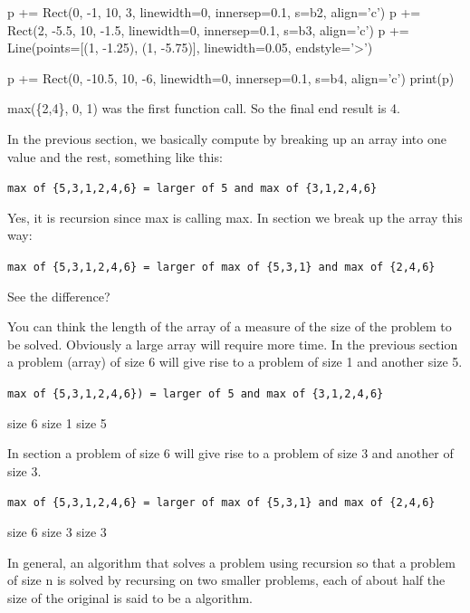 \begin{python}
p += Rect(0, -1, 10, 3, linewidth=0, innersep=0.1, s=b2, align='c')
p += Rect(2, -5.5, 10, -1.5, linewidth=0, innersep=0.1, s=b3, align='c')
p += Line(points=[(1, -1.25), (1, -5.75)], linewidth=0.05, endstyle='>')

p += Rect(0, -10.5, 10, -6, linewidth=0, innersep=0.1, s=b4, align='c')
print(p)
\end{python}
max(\{2,4\}, 0, 1) was the first function call. So the final end result
is 4.






In the previous section, we basically compute by breaking up an array
into one value and the rest, something like this:

\verb!max of {5,3,1,2,4,6} = larger of 5 and max of {3,1,2,4,6}!

Yes, it is recursion since max is calling max. In 
section we break up the array this way:

\verb!max of {5,3,1,2,4,6} = larger of max of {5,3,1} and max of {2,4,6}!

See the difference?

You can think the length of the array of a measure of the size of the
problem to be solved. Obviously a large array will require more time. In
the previous section a problem (array) of size 6 will give rise to a
problem of size 1 and another size 5.

\verb!max of {5,3,1,2,4,6}) = larger of 5 and max of {3,1,2,4,6}!


size 6 \hspace{2cm} size 1 \hspace{2cm} size 5


In  section a problem of size 6 will give rise to a
problem of size 3 and another of size 3.

\verb!max of {5,3,1,2,4,6} = larger of max of {5,3,1} and max of {2,4,6}!


size 6 \hspace{2cm} size 3 \hspace{2cm} size 3


In general, an algorithm that solves a problem using recursion so that a
problem of size n is solved by recursing on two smaller problems, each
of about half the size of the original is said to be a
 algorithm.

